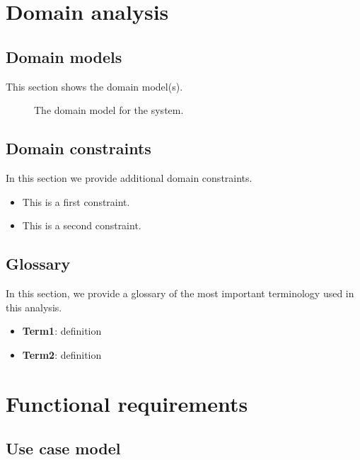 \documentclass[english]{sareport}
\begin{document}
\maketitle

\tableofcontents

\chapter{Domain analysis}\label{sec:domain}
\section{Domain models}
This section shows the domain model(s).

\begin{figure}[!htp]
    \centering
    \caption{The domain model for the system.}\label{fig:domain_model}
\end{figure}

\section{Domain constraints}
In this section we provide additional domain constraints.

\begin{itemize}
    \item This is a first constraint.
    \item This is a second constraint.
\end{itemize}

\section{Glossary}
In this section, we provide a glossary of the most important terminology used
in this analysis.

\begin{itemize}
    \item \textbf{Term1}: definition
    \item \textbf{Term2}: definition
\end{itemize}

\chapter{Functional requirements}\label{sec:functional}
\section*{Use case model}
\end{document}
